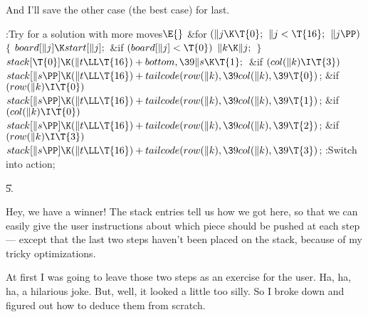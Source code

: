 And I'll save the other case (the best case) for last.

\Y\B\4:Try for a solution with  more moves\X${}\E{}$\6
\&{for} ${}(\|j\K\T{0};{}$ ${}\|j<\T{16};{}$ ${}\|j\PP){}$\5
${}\{{}$\1\6
${}\\{board}[\|j]\K\\{start}[\|j];{}$\6
\&{if} ${}(\\{board}[\|j]<\T{0}){}$\1\5
${}\|k\K\|j;{}$\2\6
\4${}\}{}$\2\6
${}\\{stack}[\T{0}]\K(\|t\LL\T{16})+\\{bottom},\39\|s\K\T{1};{}$\6
\&{if} ${}(\\{col}(\|k)\I\T{3}){}$\1\5
${}\\{stack}[\|s\PP]\K(\|t\LL\T{16})+\\{tailcode}(\\{row}(\|k),\39\\{col}(\|k),%
\39\T{0}){}$;\2\6
\&{if} ${}(\\{row}(\|k)\I\T{0}){}$\1\5
${}\\{stack}[\|s\PP]\K(\|t\LL\T{16})+\\{tailcode}(\\{row}(\|k),\39\\{col}(\|k),%
\39\T{1}){}$;\2\6
\&{if} ${}(\\{col}(\|k)\I\T{0}){}$\1\5
${}\\{stack}[\|s\PP]\K(\|t\LL\T{16})+\\{tailcode}(\\{row}(\|k),\39\\{col}(\|k),%
\39\T{2}){}$;\2\6
\&{if} ${}(\\{row}(\|k)\I\T{3}){}$\1\5
${}\\{stack}[\|s\PP]\K(\|t\LL\T{16})+\\{tailcode}(\\{row}(\|k),\39\\{col}(\|k),%
\39\T{3}){}$;\2\6
:Switch into action\X;\par
\U5.\fi

Hey, we have a winner! The stack entries tell us
how we got here,
so that we can easily give the user instructions about which piece
should be pushed at each step --- except that the last two steps haven't
been placed on the stack, because of my tricky optimizations.

At first I was going to leave those two steps as an exercise
for the user. Ha, ha, ha, a hilarious joke.
But, well, it looked a little too silly.
So I broke down and figured out how to deduce them from scratch.

